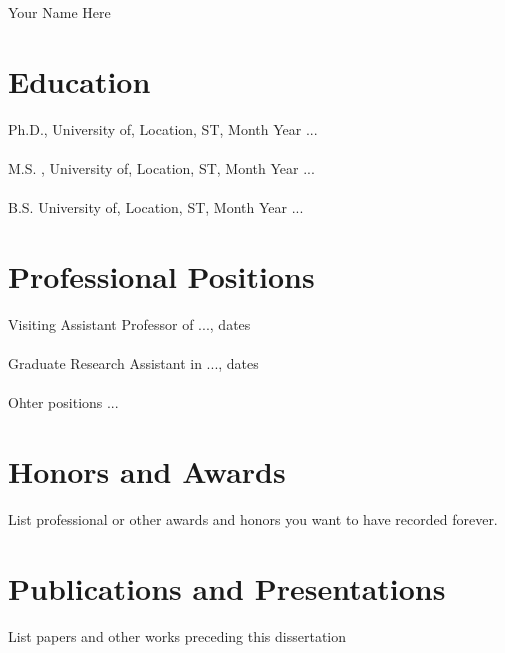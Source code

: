 \begin{center}
\large
Your Name Here
\end{center}

\bigskip


\section*{Education} 

Ph.D., University of, Location, ST, Month Year ... \\ \\
M.S. , University of, Location, ST, Month Year ...\\ \\
B.S. University of, Location, ST, Month Year ...


\section*{Professional Positions}

Visiting Assistant Professor of ..., dates \\ \\
Graduate Research Assistant in  ..., dates \\ \\
Ohter positions ...


\section*{Honors and Awards} 

List professional or other awards and honors you want to have recorded forever.


\section*{Publications and Presentations}

List papers and other works preceding this dissertation 


